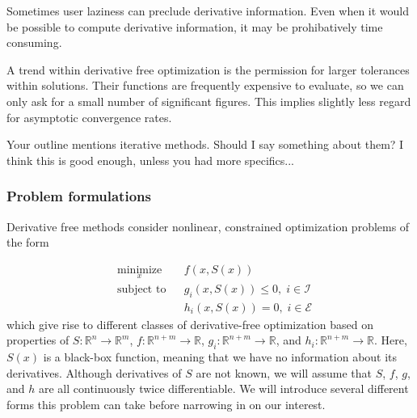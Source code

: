\documentclass{article}
\begin{document}
Sometimes user laziness can preclude derivative information.
Even when it would be possible to compute derivative information, it may be prohibatively time consuming.

A trend within derivative free optimization is the permission for larger tolerances within solutions.
Their functions are frequently expensive to evaluate, so we can only ask for a small number of significant figures.
This implies slightly less regard for asymptotic convergence rates.


\color{blue}
Your outline mentions iterative methods.
Should I say something about them?
I think this is good enough, unless you had more specifics...

\color{black}


\subsubsection{Problem formulations}

Derivative free methods consider nonlinear, constrained optimization problems of the form

\begin{equation*}
\begin{aligned}
& \underset{x}{\text{minimize}} & & f(x, S(x)) \\
& \text{subject to} & & g_i(x, S(x)) \leq 0, \; i \in \mathcal{I} \\
& & & h_i(x, S(x)) = 0, \; i \in \mathcal{E}
\end{aligned}
\end{equation*}
which give rise to different classes of derivative-free optimization based on properties of
$S  : \mathbb{R}^n \to \mathbb{R}^m$,
$f  : \mathbb{R}^{n+m} \to \mathbb{R}$,
$g_i: \mathbb{R}^{n+m} \to \mathbb{R}$, and
$h_i: \mathbb{R}^{n+m} \to \mathbb{R}$.
Here, $S(x)$ is a black-box function, meaning that we have no information about its derivatives.
Although derivatives of $S$ are not known, 
we will assume that $S$, $f$, $g$, and $h$ are all continuously twice differentiable.
We will introduce several different forms this problem can take before narrowing in on our interest.


\underline{\hspace{8cm}}
\end{document}

